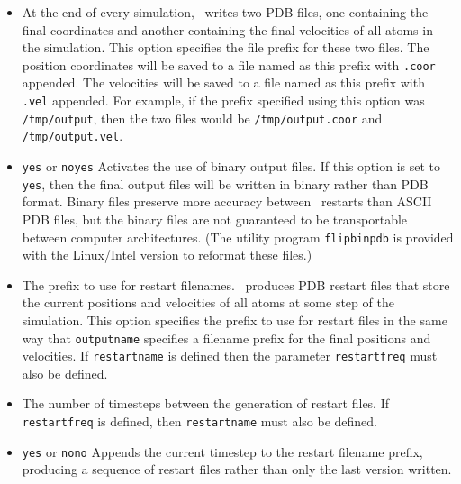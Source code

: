 \begin{itemize}
\item
{}
{\label{param:outputname}
At the end of every simulation, \NAMD\ writes two PDB files, one 
containing the final coordinates and another containing 
the final velocities of all atoms in the simulation.  
This option specifies the file prefix for these two files.  
The position coordinates will be saved to a file named as this prefix 
with {\tt .coor} appended.  
The velocities will be saved to a file 
named as this prefix with {\tt .vel} appended.  
For example, 
if the prefix specified using this option was {\tt /tmp/output}, 
then the two files 
would be {\tt /tmp/output.coor} and {\tt /tmp/output.vel}.}

\item
{}
{{\tt yes} or {\tt no}}{{\tt yes}}
{
Activates the use of binary output files.  
If this option is set to {\tt yes}, then the final output files 
will be written in binary rather than PDB format.  
Binary files preserve more accuracy between \NAMD\ restarts 
than ASCII PDB files, 
but the binary files are not guaranteed to be transportable 
between computer architectures.  
(The utility program {\tt flipbinpdb} is provided with the Linux/Intel
version to reformat these files.)
}

\item
{}
{
The prefix to use for restart filenames.  
\NAMD\ produces PDB restart files 
that store the current positions and velocities of all 
atoms at some step of the simulation.  
This option specifies the prefix to use for restart 
files in the same way that {\tt outputname} 
specifies a filename prefix for the final
positions and velocities.  
If {\tt restartname} is defined then
the parameter {\tt restartfreq} must also be defined.}

\item
{}
{
The number of timesteps between the generation of restart files.  
If {\tt restartfreq} is defined, then {\tt restartname} 
must also be defined.}

\item
{}
{{\tt yes} or {\tt no}}{{\tt no}}
{
Appends the current timestep to the restart filename prefix, producing
a sequence of restart files rather than only the last version written.
}


\end{itemize}
